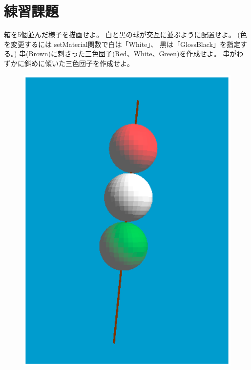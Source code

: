 \section{練習課題} \label{sec:01-q}
\begin{description}
 \myitem 箱を5個並んだ様子を描画せよ。
 \myitem 白と黒の球が交互に並ぶように配置せよ。
	(色を変更するには setMaterial関数で白は「White」、
	黒は「GlossBlack」を指定する。)
 \myitem 串(Brown)に刺さった三色団子(Red、White、Green)を作成せよ。
 \myitem 串がわずかに斜めに傾いた三色団子を作成せよ。
\end{description}
\begin{figure}[H]
\centering
\includegraphics[scale=0.5]{./Fig/Fig01-01.eps}
\end{figure}
